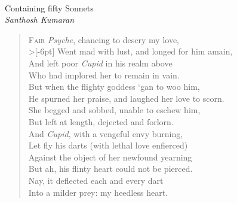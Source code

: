 \documentclass[a5paper, 12pt, oneside]{memoir}
\begin{document}
\begin{titlingpage}
\null  %
\nointerlineskip  %
\vfill
\let\snewpage \newpage
\let\newpage \relax

\centering
{\HUGE {}} \\[5pt]
{\Large Containing fifty Sonnets} \\[10pt]
{\Large\itshape Santhosh Kumaran}

\let \newpage \snewpage
\vfill 
\break %
\end{titlingpage}

\PoemTitle{}
\begin{verse}
    \lettrine{F}{air} \textit{Psyche}, chancing to descry my love, \\>[-6pt]
    Went mad with lust, and longed for him amain, \\
    And left poor \textit{Cupid} in his realm above \\
    Who had implored her to remain in vain. \\
    But when the flighty goddess `gan to woo him, \\
    He spurned her praise, and laughed her love to scorn. \\
    She begged and sobbed, unable to eschew him, \\
    But left at length, dejected and forlorn. \\
    And \textit{Cupid}, with a vengeful envy burning, \\
    Let fly his darts (with lethal love enfierced) \\
    Against the object of her newfound yearning \\
    But ah, his flinty heart could not be pierced. \\
    \vin Nay, it deflected each and every dart \\
    \vin Into a milder prey: my heedless heart.
\end{verse}
\end{document}
